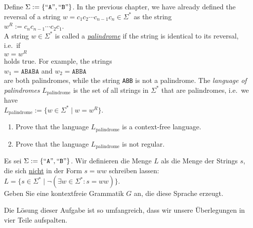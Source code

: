 \exerciseEng
Define $\Sigma := \{ \mbox{``\texttt{A}''}, \mbox{``\texttt{B}''} \}$. 
In the previous chapter, we have already defined the reversal of a string 
$w = c_1 c_2 \cdots c_{n-1} c_n \in \Sigma^*$ as the string
\\[0.2cm]
\hspace*{1.3cm}
$w^R := c_n c_{n-1} \cdots c_2 c_1$.
\\[0.2cm]
A string $w \in \Sigma^*$ is called a
\href{http://en.wikipedia.org/wiki/Palindrome}{\emph{palindrome}} if the string is identical to its
reversal, i.e.~if
\\[0.2cm]
\hspace*{1.3cm}
$w = w^R$
\\[0.2cm]
holds true.  For example, the strings 
\\[0.2cm]
\hspace*{1.3cm}
$w_1 = \mathtt{ABABA}$ \quad and \quad $w_2 = \mathtt{ABBA}$
\\[0.2cm]
are both palindromes, while the string \texttt{ABB} is not a palindrome. The 
\emph{language of palindromes} $L_\mathrm{palindrome}$ is the set of all 
strings in $\Sigma^*$ that are palindromes, i.e.~we have
\\[0.2cm]
\hspace*{1.3cm}
$L_\mathrm{palindrome} := \bigr\{ w \in \Sigma^* \mid w = w^R \bigr\}$.
\renewcommand{\labelenumi}{(\alph{enumi})}
\begin{enumerate}
\item Prove that the language $L_\mathrm{palindrome}$ is a context-free language.
\item Prove that the language $L_\mathrm{palindrome}$ is not regular.  \eox
\end{enumerate}
\renewcommand{\labelenumi}{\arabic{enumi}.}

 

\exerciseStar
Es sei $\Sigma := \{ \mbox{``\texttt{A}''}, \mbox{``\texttt{B}''} \}$.  Wir definieren die Menge $L$ als die
Menge der Strings $s$, die sich \underline{nicht} in der Form $s = ww$ schreiben lassen:
\\[0.2cm]
\hspace*{1.3cm}
$L = \bigl\{ s \in \Sigma^* \mid \neg(\exists w\in\Sigma^*: s = ww)\bigr\}$.
\\[0.2cm]
Geben Sie eine kontextfreie Grammatik $G$ an, die diese Sprache erzeugt.
\eox

\solution 
Die L\"osung dieser Aufgabe ist so umfangreich, dass wir unsere \"Uberlegungen in vier Teile aufspalten.
\vspace{0.2cm}

